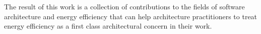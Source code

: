 \documentclass[a4paper, oneside, 11pt, hidelinks]{Thesis}  %
\begin{document}
{The result of this work is a collection of contributions to the fields of software architecture and energy efficiency that can help architecture practitioners to treat energy efficiency as a first class architectural concern in their work.

\clearpage  %

%
%
%
% 
% 
% 
% 
% 
% 
% 
% 

\tableofcontents  %

}
\end{document}

